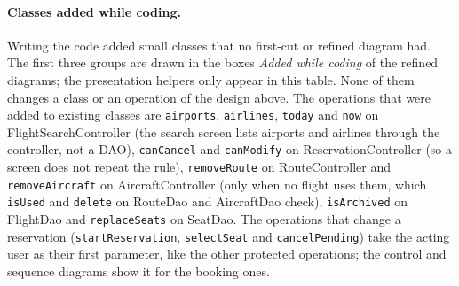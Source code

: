 \paragraph{Classes added while coding.} Writing the code added small classes that
no first-cut or refined diagram had. The first three groups are drawn in the
boxes \emph{Added while coding} of the refined diagrams; the presentation helpers
only appear in this table. None of them changes a class or an operation of the
design above. The operations that were added to existing classes are
\texttt{airports}, \texttt{airlines}, \texttt{today} and \texttt{now} on FlightSearchController
(the search screen lists airports and airlines through the controller, not a DAO),
\texttt{canCancel} and \texttt{canModify} on ReservationController (so a screen
does not repeat the rule), \texttt{removeRoute} on RouteController and
\texttt{removeAircraft} on AircraftController (only when no flight uses them, which
\texttt{isUsed} and \texttt{delete} on RouteDao and AircraftDao check),
\texttt{isArchived} on FlightDao and \texttt{replaceSeats} on SeatDao. The operations that
change a reservation (\texttt{startReservation}, \texttt{selectSeat} and
\texttt{cancelPending}) take the acting user as their first parameter, like the other
protected operations; the control and sequence diagrams show it for the booking ones.

